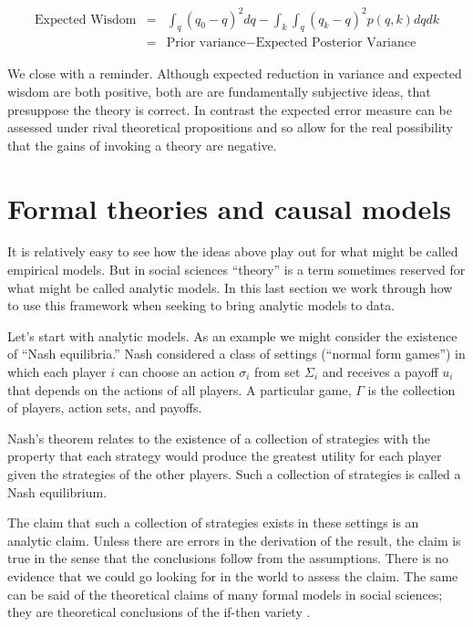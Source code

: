 \documentclass[
  12pt,
]{book}
\begin{document}
\begin{eqnarray}
\text{Expected Wisdom}  &=& \int_q(q_0 - q)^2dq - \int_k\int_q(q_k - q)^2 p(q, k)dqdk\\
&=& \text{Prior variance} - \text{Expected Posterior Variance}
\end{eqnarray}

We close with a reminder. Although expected reduction in variance and expected wisdom are both positive, both are are fundamentally subjective ideas, that presuppose the theory is correct. In contrast the expected error measure can be assessed under rival theoretical propositions and so allow for the real possibility that the gains of invoking a theory are negative.

\hypertarget{formal-theories-and-causal-models}{%
\section{Formal theories and causal models}\label{formal-theories-and-causal-models}}

It is relatively easy to see how the ideas above play out for what might be called empirical models. But in social sciences ``theory'' is a term sometimes reserved for what might be called analytic models. In this last section we work through how to use this framework when seeking to bring analytic models to data.

Let's start with analytic models. As an example we might consider the existence of ``Nash equilibria.'' Nash considered a class of settings (``normal form games'') in which each player \(i\) can choose an action \(\sigma_i\) from set \(\Sigma_i\) and receives a payoff \(u_i\) that depends on the actions of all players. A particular game, \(\Gamma\) is the collection of players, action sets, and payoffs.

Nash's theorem relates to the existence of a collection of strategies with the property that each strategy would produce the greatest utility for each player given the strategies of the other players. Such a collection of strategies is called a Nash equilibrium.

The claim that such a collection of strategies exists in these settings is an analytic claim. Unless there are errors in the derivation of the result, the claim is true in the sense that the conclusions follow from the assumptions. There is no evidence that we could go looking for in the world to assess the claim. The same can be said of the theoretical claims of many formal models in social sciences; they are theoretical conclusions of the if-then variety \citep{clarke2012model}.
\end{document}
